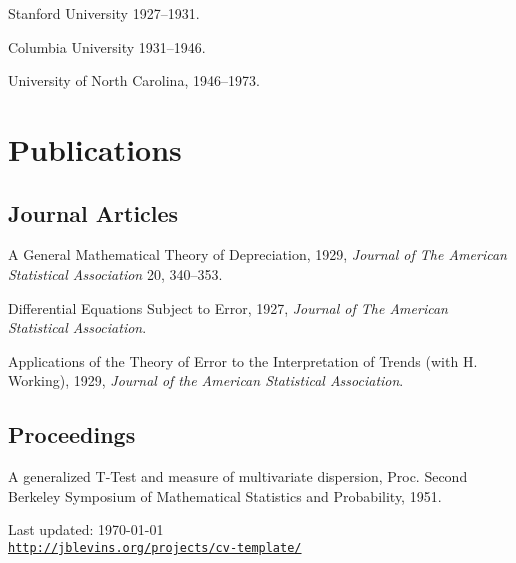\documentclass[letterpaper]{article}
\def\footerlink{http://jblevins.org/projects/cv-template/}
\renewenvironment{itemize}{
  \begin{list}{}{
    \setlength{\leftmargin}{1.5em}
  }
}{
  \end{list}
}
\begin{document}
\begin{itemize}
\item Stanford University 1927--1931.
\item Columbia University 1931--1946.
\item University of North Carolina, 1946--1973.
\end{itemize}


\section*{Publications}

\subsection*{Journal Articles}

\begin{itemize}
\item A General Mathematical Theory of Depreciation, 1929, {\it Journal
    of The American Statistical Association} 20, 340--353.
\item Differential Equations Subject to Error, 1927, {\it Journal of The
    American Statistical Association}.
\item Applications of the Theory of Error to the Interpretation of
  Trends (with H. Working), 1929, {\it Journal of the American
    Statistical Association}.
\end{itemize}

\subsection*{Proceedings}

\begin{itemize}
\item A generalized T-Test and measure of multivariate dispersion,
  Proc. Second Berkeley Symposium of Mathematical Statistics and
  Probability, 1951.
\end{itemize}

\bigskip

\begin{center}
  \begin{footnotesize}
    Last updated: \today \\
    \href{\footerlink}{\texttt{\footerlink}}
  \end{footnotesize}
\end{center}
\end{document}

